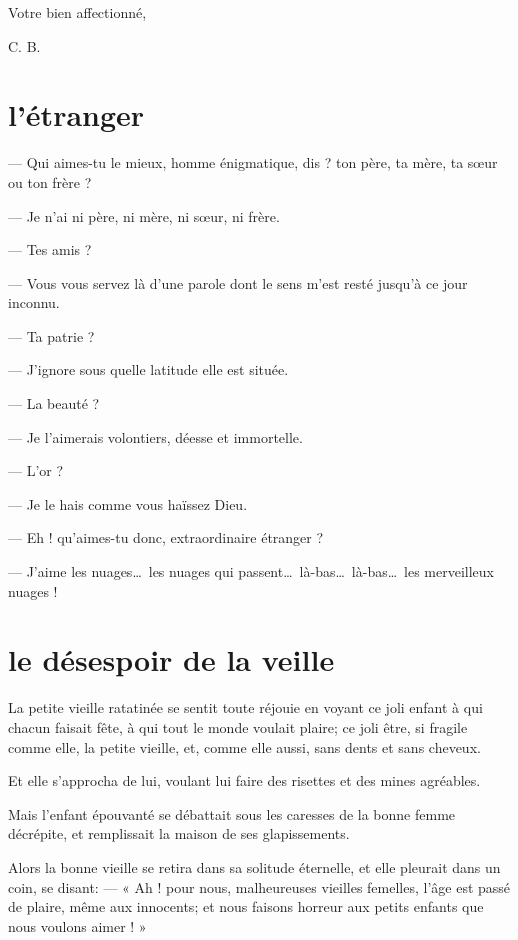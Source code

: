 \begin{flushright}
Votre bien affectionné, 

C. B.
\end{flushright}


\setcounter{secnumdepth}{2} %

\quebra\section[L’étranger]{l’étranger}

--- Qui aimes{}-tu le mieux, homme énigmatique, dis ? ton père, ta mère,
ta s\oe ur ou ton frère ?

--- Je n’ai ni père, ni mère, ni s\oe ur, ni frère.

--- Tes amis ?

--- Vous vous servez là d’une parole dont le sens
m’est resté jusqu’à ce jour inconnu.

--- Ta patrie ?

--- J’ignore sous quelle latitude elle est située.

--- La beauté ?

--- Je l’aimerais volontiers, déesse et immortelle.

--- L’or ?

--- Je le hais comme vous haïssez Dieu.

--- Eh ! qu’aimes{}-tu donc, extraordinaire étranger ?

--- J’aime les nuages\ldots\ les nuages qui passent\ldots\ 
là{}-bas\ldots\ là{}-bas\ldots\ les merveilleux nuages !

\quebra\section[Le désespoir de la veille]{le désespoir de la veille}

La petite vieille ratatinée se sentit toute réjouie en voyant ce joli
enfant à qui chacun faisait fête, à qui tout le monde voulait plaire;
ce joli être, si fragile comme elle, la petite vieille, et, comme elle
aussi, sans dents et sans cheveux.

Et elle s’approcha de lui, voulant lui faire des
risettes et des mines agréables.

Mais l’enfant épouvanté se débattait sous les caresses
de la bonne femme décrépite, et remplissait la maison de ses
glapissements.

Alors la bonne vieille se retira dans sa solitude éternelle, et elle
pleurait dans un coin, se disant: --- « Ah ! pour nous, malheureuses
vieilles femelles, l’âge est passé de plaire, même aux
innocents; et nous faisons horreur aux petits enfants que nous voulons
aimer ! »

